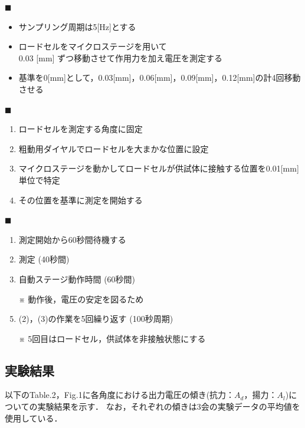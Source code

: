 \documentclass[twocolumn,a4j]{jsarticle}
\begin{document}
$\blacksquare$ 
\begin{itemize}
    \item サンプリング周期は5[Hz]とする
    \item ロードセルをマイクロステージを用いて\\
          0.03 [mm] ずつ移動させて作用力を加え電圧を測定する
    \item 基準を0[mm]として，0.03[mm]，0.06[mm]，0.09[mm]，0.12[mm]の計4回移動させる
\end{itemize}

$\blacksquare$ 
\begin{enumerate}[(1)]
    \item ロードセルを測定する角度に固定
    \item 粗動用ダイヤルでロードセルを大まかな位置に設定
    \item マイクロステージを動かしてロードセルが供試体に接触する位置を0.01[mm]単位で特定
    \item その位置を基準に測定を開始する
\end{enumerate}

$\blacksquare$ 
\begin{enumerate}[(1)]
    \item 測定開始から60秒間待機する
    \item 測定 (40秒間)
    \item 自動ステージ動作時間 (60秒間)
    \item [※] 動作後，電圧の安定を図るため
    \item (2)，(3)の作業を5回繰り返す (100秒周期)
    \item [※] 5回目はロードセル，供試体を非接触状態にする
\end{enumerate}

\newpage

\subsection{実験結果}

以下のTable.2，Fig.1に各角度における出力電圧の傾き(抗力：$A_d$，揚力：$A_l$)についての実験結果を示す．
なお，それぞれの傾きは3会の実験データの平均値を使用している．
\end{document}
